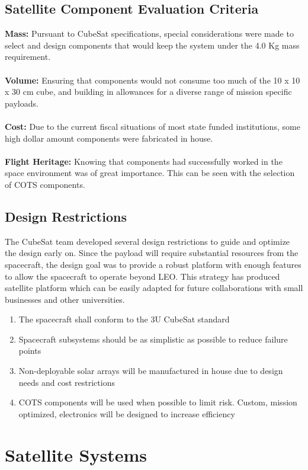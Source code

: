 \documentclass[nocover]            %
{CSLI}                       %
\begin{document}
\subsection{Satellite Component Evaluation Criteria}
\textbf{Mass:} Pursuant to CubeSat specifications, special considerations were made to select and design components that would keep the system under the 4.0 Kg mass requirement.\\
\\\textbf{Volume:} Ensuring that components would not consume too much of the 10 x 10 x 30 cm cube, and building in allowances for a diverse range of mission specific payloads. \\
\\\textbf{Cost:} Due to the current fiscal situations of most state funded institutions, some high dollar amount components were fabricated in house. \\
\\\textbf{Flight Heritage:} Knowing that components had successfully worked in the space environment was of great importance. This can be seen with the selection of COTS components.\\
\subsection{Design Restrictions}
The CubeSat team developed several design restrictions to guide and optimize the design early on. Since the payload will require substantial resources from the spacecraft, the design goal was to provide a robust platform with enough features to allow the spacecraft to operate beyond LEO. This strategy has produced satellite platform which can be easily adapted for future collaborations with small businesses and other universities.
\begin{enumerate}
\item The spacecraft shall conform to the 3U CubeSat standard
\item Spacecraft subsystems should be as simplistic as possible to reduce failure points
\item Non-deployable solar arrays will be manufactured in house due to design needs and cost restrictions
\item COTS components will be used when possible to limit risk. Custom, mission optimized, electronics will be designed to increase efficiency
\end{enumerate}

\newpage
\section{Satellite Systems}
\end{document}
